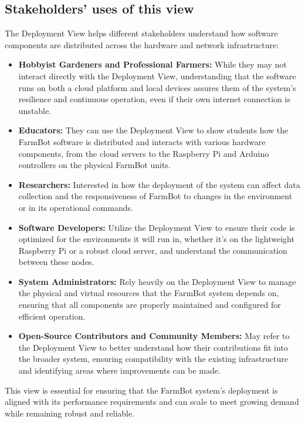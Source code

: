 \subsection{Stakeholders’ uses of this view}
The Deployment View helps different stakeholders understand how software components are distributed across the hardware and network infrastructure:
\begin{itemize}
    \item \textbf{Hobbyist Gardeners and Professional Farmers:} While they may not interact directly with the Deployment View, understanding that the software runs on both a cloud platform and local devices assures them of the system's resilience and continuous operation, even if their own internet connection is unstable.
    \item \textbf{Educators:} They can use the Deployment View to show students how the FarmBot software is distributed and interacts with various hardware components, from the cloud servers to the Raspberry Pi and Arduino controllers on the physical FarmBot units.
    \item \textbf{Researchers:} Interested in how the deployment of the system can affect data collection and the responsiveness of FarmBot to changes in the environment or in its operational commands.
    \item \textbf{Software Developers:} Utilize the Deployment View to ensure their code is optimized for the environments it will run in, whether it's on the lightweight Raspberry Pi or a robust cloud server, and understand the communication between these nodes.
    \item \textbf{System Administrators:} Rely heavily on the Deployment View to manage the physical and virtual resources that the FarmBot system depends on, ensuring that all components are properly maintained and configured for efficient operation.
    \item \textbf{Open-Source Contributors and Community Members:} May refer to the Deployment View to better understand how their contributions fit into the broader system, ensuring compatibility with the existing infrastructure and identifying areas where improvements can be made.
\end{itemize}
This view is essential for ensuring that the FarmBot system's deployment is aligned with its performance requirements and can scale to meet growing demand while remaining robust and reliable.

\newpage
